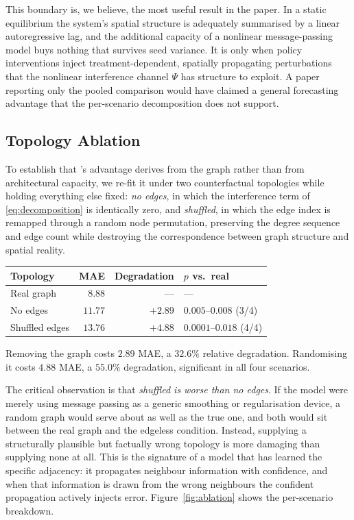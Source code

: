 This boundary is, we believe, the most useful result in the paper. In a static
equilibrium the system's spatial structure is adequately summarised by a linear
autoregressive lag, and the additional capacity of a nonlinear message-passing
model buys nothing that survives seed variance. It is only when policy
interventions inject treatment-dependent, spatially propagating perturbations
that the nonlinear interference channel $\Psi$ has structure to exploit. A
paper reporting only the pooled comparison would have claimed a general
forecasting advantage that the per-scenario decomposition does not support.

\subsection{Topology Ablation}

To establish that \CGCEN{}'s advantage derives from the graph rather than from
architectural capacity, we re-fit it under two counterfactual topologies while
holding everything else fixed: \emph{no edges}, in which the interference term
of \eqref{eq:decomposition} is identically zero, and \emph{shuffled}, in which
the edge index is remapped through a random node permutation, preserving the
degree sequence and edge count while destroying the correspondence between
graph structure and spatial reality.

\begin{center}
\begin{tabular}{lrrl}
\toprule
\textbf{Topology} & \textbf{MAE} & \textbf{Degradation} & \textbf{$p$ vs.\ real} \\
\midrule
Real graph      & $8.88$  & ---     & --- \\
No edges        & $11.77$ & $+2.89$ & $0.005$--$0.008$ (3/4) \\
Shuffled edges  & $13.76$ & $+4.88$ & $0.0001$--$0.018$ (4/4) \\
\bottomrule
\end{tabular}
\end{center}

Removing the graph costs $2.89$ MAE, a $32.6\%$ relative degradation.
Randomising it costs $4.88$ MAE, a $55.0\%$ degradation, significant in all
four scenarios.

The critical observation is that \emph{shuffled is worse than no edges}. If the
model were merely using message passing as a generic smoothing or
regularisation device, a random graph would serve about as well as the true
one, and both would sit between the real graph and the edgeless condition.
Instead, supplying a structurally plausible but factually wrong topology is
more damaging than supplying none at all. This is the signature of a model that
has learned the specific adjacency: it propagates neighbour information with
confidence, and when that information is drawn from the wrong neighbours the
confident propagation actively injects error.
Figure~\ref{fig:ablation} shows the per-scenario breakdown.


